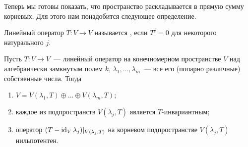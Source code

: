 Теперь мы готовы показать, что пространство раскладывается
в прямую сумму корневых.
Для этого нам понадобится следующее определение.
\begin{definition}
Линейный оператор $T\colon V\to V$ называется ,
если $T^j=0$ для некоторого натурального $j$.
\end{definition}

\begin{theorem}\label{thm:root-space-decomposition}
Пусть $T\colon V\to V$~--- линейный оператор на конечномерном
пространстве $V$ над алгебраически замкнутым полем $k$,
$\lambda_1,\dots,\lambda_m$~--- все его (попарно различные)
собственные числа. Тогда
\begin{enumerate}
\item $V = V(\lambda_1,T) \oplus \dots \oplus V(\lambda_m,T)$;
\item каждое из подпространств $V(\lambda_j,T)$ является
$T$-инвариантным;
\item оператор $(T-\operatorname{id}_V\lambda_j)|_{V(\lambda_j,T)}$ на
корневом подпространстве $V(\lambda_j,T)$ нильпотентен.
\end{enumerate}
\end{theorem}
